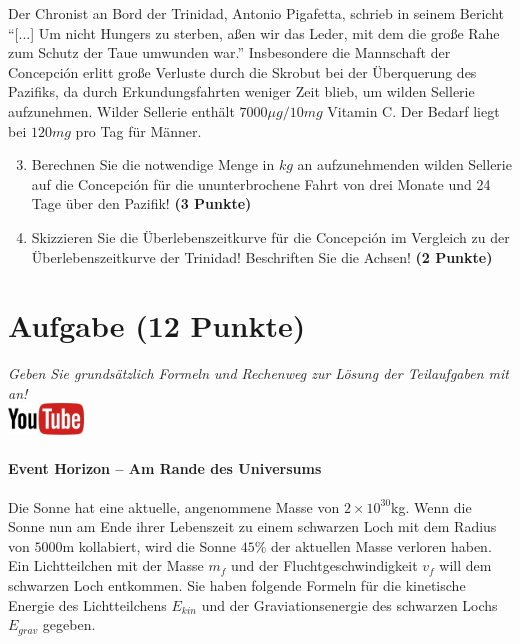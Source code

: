 \documentclass[a4paper, 10pt]{scrartcl}\usepackage[]{graphicx}\usepackage[]{xcolor}
\begin{document}
Der Chronist an Bord der Trinidad, Antonio Pigafetta, schrieb in seinem
Bericht "`[...] Um nicht Hungers zu sterben, a{\ss}en wir das Leder, mit dem
die gro{\ss}e Rahe zum Schutz der Taue umwunden war."' Insbesondere die
Mannschaft der Concepci{\'o}n erlitt gro{\ss}e Verluste durch die Skrobut bei der
{\"U}berquerung des Pazifiks, da durch Erkundungsfahrten weniger Zeit blieb, um
wilden Sellerie aufzunehmen. Wilder Sellerie enth{\"a}lt
$7000\mu g/10mg$ Vitamin C. Der Bedarf liegt bei
$120mg$ pro Tag f{\"u}r M{\"a}nner.

\begin{enumerate}
  \setcounter{enumi}{2}
\item Berechnen Sie die notwendige Menge in $kg$ an
  aufzunehmenden wilden Sellerie auf die Concepci{\'o}n f{\"u}r die ununterbrochene
  Fahrt von drei Monate und 24 Tage {\"u}ber den Pazifik!
  \textbf{(3 Punkte)}
\item Skizzieren Sie die {\"U}berlebenszeitkurve f{\"u}r die Concepci{\'o}n im
  Vergleich zu der {\"U}berlebenszeitkurve der Trinidad! Beschriften Sie die
  Achsen! \textbf{(2 Punkte)}
\end{enumerate}

 
\clearpage

\section{Aufgabe \hfill (12 Punkte)}

\textit{Geben Sie grunds{\"a}tzlich Formeln und Rechenweg zur L{\"o}sung der
  Teilaufgaben mit an!} \\[1Ex]

\hfill\href{https://youtu.be/q-qYK4Chslg}{\includegraphics[width =
  2cm]{img/youtube}} %
\hspace{2Ex}

\paragraph{Event Horizon -- Am Rande des Universums}



Die Sonne hat eine aktuelle, angenommene Masse von $\ensuremath{2\times 10^{30}}$kg. Wenn
die Sonne nun am Ende ihrer Lebenszeit zu einem schwarzen Loch mit dem
Radius von $5000$m kollabiert, wird die Sonne $45$\%
der aktuellen Masse verloren haben. Ein Lichtteilchen mit der Masse $m_f$
und der Fluchtgeschwindigkeit $v_f$ will dem schwarzen Loch entkommen.  Sie
haben folgende Formeln f{\"u}r die kinetische Energie des Lichtteilchens
$E_{kin}$ und der Graviationsenergie des schwarzen Lochs $E_{grav}$
gegeben.
\end{document}

